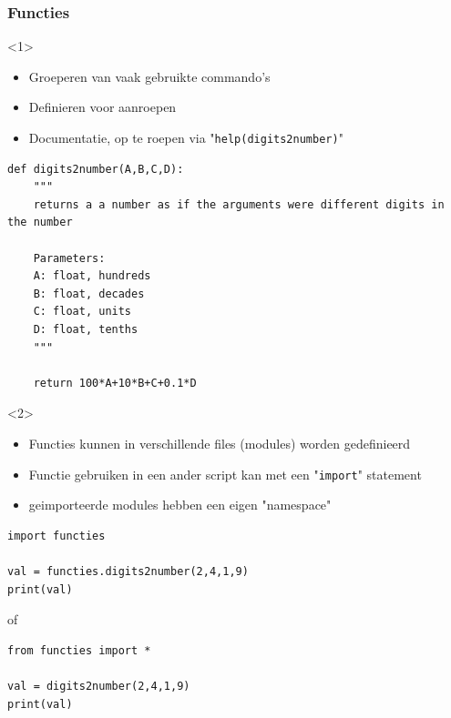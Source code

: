 \documentclass[t]{beamer}
\begin{document}
\begin{frame}[fragile]
	\frametitle{Functies}
\begin{onlyenv}<1>
	\begin{itemize}
		\item Groeperen van vaak gebruikte commando's
		\item Definieren voor aanroepen
		\item Documentatie, op te roepen via "\lstinline{help(digits2number)}"
	\end{itemize}

	\begin{lstlisting}
def digits2number(A,B,C,D):
	"""
	returns a a number as if the arguments were different digits in the number
	
	Parameters:
	A: float, hundreds
	B: float, decades
	C: float, units
	D: float, tenths
	"""
	
	return 100*A+10*B+C+0.1*D
	\end{lstlisting}
\end{onlyenv}
\begin{onlyenv}<2>
	\begin{itemize}
		\item Functies kunnen in verschillende files (modules) worden gedefinieerd
		\item Functie gebruiken in een ander script kan met een "\lstinline{import}" statement
		\item geimporteerde modules hebben een eigen "namespace"
	\end{itemize}
	
	\vspace{0.2cm}
	\begin{lstlisting}
import functies

val = functies.digits2number(2,4,1,9)
print(val)
	\end{lstlisting}
of
	\begin{lstlisting}
from functies import *

val = digits2number(2,4,1,9)
print(val)
	\end{lstlisting}
\end{onlyenv}
\end{frame}
\end{document}
